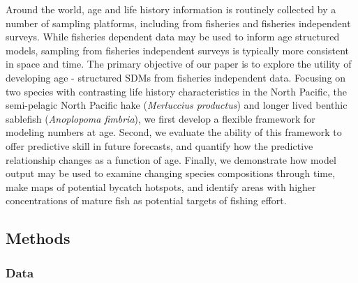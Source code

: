 \documentclass[
]{article}
\begin{document}
Around the world, age and life history information is routinely
collected by a number of sampling platforms, including from fisheries
and fisheries independent surveys. While fisheries dependent data may be
used to inform age structured models, sampling from fisheries
independent surveys is typically more consistent in space and time. The
primary objective of our paper is to explore the utility of developing
age - structured SDMs from fisheries independent data. Focusing on two
species with contrasting life history characteristics in the North
Pacific, the semi-pelagic North Pacific hake (\emph{Merluccius
productus}) and longer lived benthic sablefish (\emph{Anoplopoma
fimbria}), we first develop a flexible framework for modeling numbers at
age. Second, we evaluate the ability of this framework to offer
predictive skill in future forecasts, and quantify how the predictive
relationship changes as a function of age. Finally, we demonstrate how
model output may be used to examine changing species compositions
through time, make maps of potential bycatch hotspots, and identify
areas with higher concentrations of mature fish as potential targets of
fishing effort.

\hypertarget{methods}{%
\subsection{Methods}\label{methods}}

\hypertarget{data}{%
\subsubsection{Data}\label{data}}
\end{document}
